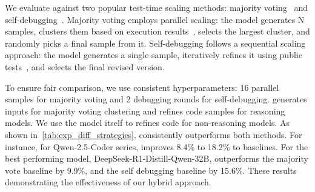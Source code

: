 We evaluate \frameworkname against two popular test-time scaling methods: majority voting~\citep{li2022competition} and self-debugging~\citep{chen2023teaching}. Majority voting employs parallel scaling: the model generates N samples, clusters them based on execution results~\citep{li2022competition}, selects the largest cluster, and randomly picks a final sample from it. Self-debugging follows a sequential scaling approach: the model generates a single sample, iteratively refines it using public tests~\citep{chen2023teaching}, and selects the final revised version.

To ensure fair comparison, we use consistent hyperparameters: 16 parallel samples for majority voting and 2 debugging rounds for self-debugging. \fouromini generates inputs for majority voting clustering and refines code samples for reasoning models. We use the model itself to refines code for non-reasoning models. As shown in~\cref{tab:exp_diff_strategies}, \frameworkname consistently outperforms both methods. For instance, for Qwen-2.5-Coder series, \frameworkname improves 8.4\% to 18.2\% to baselines. For the best performing model, DeepSeek-R1-Distill-Qwen-32B, \frameworkname outperforms the majority vote baseline by 9.9\%, and the self debugging baseline by 15.6\%. These results demonstrating the effectiveness of our hybrid approach.



